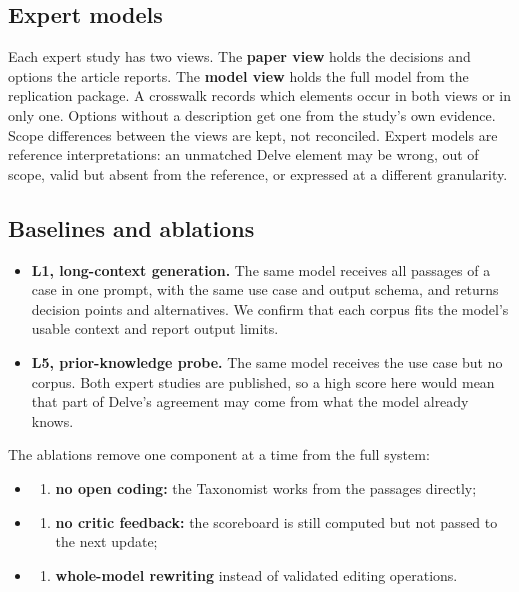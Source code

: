 \documentclass[conference]{IEEEtran}
\providecommand{\tightlist}{\setlength{\itemsep}{0pt}\setlength{\parskip}{0pt}}
\begin{document}
\subsection{Expert models}

Each expert study has two views. The \textbf{paper view} holds the decisions and options the article reports. The \textbf{model view} holds the full model from the replication package. A crosswalk records which elements occur in both views or in only one. Options without a description get one from the study's own evidence. Scope differences between the views are kept, not reconciled. Expert models are reference interpretations: an unmatched Delve element may be wrong, out of scope, valid but absent from the reference, or expressed at a different granularity.

\subsection{Baselines and ablations}\label{sec:baselines}

\begin{itemize}
\tightlist
\item
  \textbf{L1, long-context generation.} The same model receives all passages of a case in one prompt, with the same use case and output schema, and returns decision points and alternatives. We confirm that each corpus fits the model's usable context and report output limits.
\item
  \textbf{L5, prior-knowledge probe.} The same model receives the use case but no corpus. Both expert studies are published, so a high score here would mean that part of Delve's agreement may come from what the model already knows.
\end{itemize}

The ablations remove one component at a time from the full system:

\begin{itemize}
\item
  \begin{enumerate}
  \def\labelenumi{(\alph{enumi})}
  \tightlist
  \item
    \textbf{no open coding:} the Taxonomist works from the passages directly;
  \end{enumerate}
\item
  \begin{enumerate}
  \def\labelenumi{(\alph{enumi})}
  \setcounter{enumi}{1}
  \tightlist
  \item
    \textbf{no critic feedback:} the scoreboard is still computed but not passed to the next update;
  \end{enumerate}
\item
  \begin{enumerate}
  \def\labelenumi{(\alph{enumi})}
  \setcounter{enumi}{2}
  \tightlist
  \item
    \textbf{whole-model rewriting} instead of validated editing operations.
  \end{enumerate}
\end{itemize}
\end{document}
